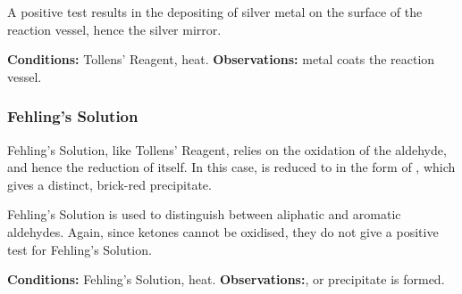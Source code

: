 				A positive test results in the depositing of silver metal on the surface of the reaction vessel, hence the silver mirror.

				\vspace{1.5em}
				\vbox{\textbf{Conditions:}	\tabto{35mm}Tollens' Reagent, heat.}
				\vbox{\textbf{Observations:}\tabto{35mm} metal coats the reaction vessel.}





			\subsubsection{Fehling's Solution}

				Fehling's Solution, like Tollens' Reagent, relies on the oxidation of the aldehyde, and hence the reduction of itself. In
				this case,  is reduced to  in the form of , which gives a distinct, brick-red precipitate.

				Fehling's Solution is used to distinguish between aliphatic and aromatic aldehydes. Again, since ketones cannot be oxidised,
				they do not give a positive test for Fehling's Solution.


				\vspace{1.5em}
				\vbox{\textbf{Conditions:}	\tabto{35mm}Fehling's Solution, heat.}
				\vbox{\textbf{Observations:}\tabto{35mm}, or  precipitate is formed.}

